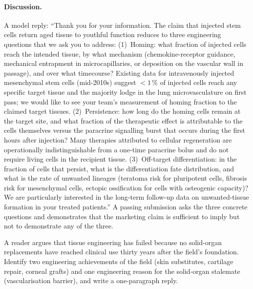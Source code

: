 \paragraph{Discussion.} A model reply: ``Thank you for your
information. The claim that injected stem cells return aged tissue
to youthful function reduces to three engineering questions that we
ask you to address: (1)~Homing: what fraction of injected cells
reach the intended tissue, by what mechanism (chemokine-receptor
guidance, mechanical entrapment in microcapillaries, or
deposition on the vascular wall in passage), and over what
timecourse? Existing data for intravenously injected mesenchymal
stem cells (mid-2010s) suggest $< 1\,\%$ of injected cells reach
any specific target tissue and the majority lodge in the lung
microvasculature on first pass; we would like to see your team's
measurement of homing fraction to the claimed target tissues.
(2)~Persistence: how long do the homing cells remain at the target
site, and what fraction of the therapeutic effect is attributable
to the cells themselves versus the paracrine signalling burst that
occurs during the first hours after injection? Many therapies
attributed to cellular regeneration are operationally indistinguishable
from a one-time paracrine bolus and do not require living cells in
the recipient tissue. (3)~Off-target differentiation: in the
fraction of cells that persist, what is the differentiation fate
distribution, and what is the rate of unwanted lineages (teratoma
risk for pluripotent cells, fibrosis risk for mesenchymal cells,
ectopic ossification for cells with osteogenic capacity)? We are
particularly interested in the long-term follow-up data on
unwanted-tissue formation in your treated patients.'' A passing
submission asks the three concrete questions and demonstrates that
the marketing claim is sufficient to imply but not to demonstrate
any of the three.

\begin{exercise}
A reader argues that tissue engineering has failed because no
solid-organ replacements have reached clinical use thirty years
after the field's foundation. Identify two engineering achievements
of the field (skin substitutes, cartilage repair, corneal grafts)
and one engineering reason for the solid-organ stalemate
(vascularisation barrier), and write a one-paragraph reply.
\end{exercise}

